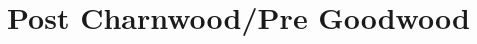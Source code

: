 \documentclass[noraggedright]{turabian-researchpaper}
\begin{document}
%
%
%
%
%
%
%
%
%
%
%
%
%
%
%
%
%
%
%

\section{Post Charnwood/Pre Goodwood}
\end{document}

